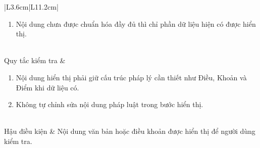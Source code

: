 \documentclass[12pt,a4paper,oneside]{report}
\begin{document}
{\begin{longtable}{|L{3.6cm}|L{11.2cm}|}
\begin{enumerate}[leftmargin=*,nosep]
                            \item Nội dung chưa được chuẩn hóa đầy đủ thì chỉ phần dữ liệu hiện có được hiển thị.
                          \end{enumerate}               \\
    \hline
    Quy tắc kiểm tra    & \begin{enumerate}[leftmargin=*,nosep]
                            \item Nội dung hiển thị phải giữ cấu trúc pháp lý cần thiết như Điều, Khoản và Điểm khi dữ liệu có.
                            \item Không tự chỉnh sửa nội dung pháp luật trong bước hiển thị.
                          \end{enumerate} \\
    \hline
    Hậu điều kiện       & Nội dung văn bản hoặc điều khoản được hiển thị để người dùng kiểm tra.                             \\
    \hline
  \end{longtable}
}
\end{document}
